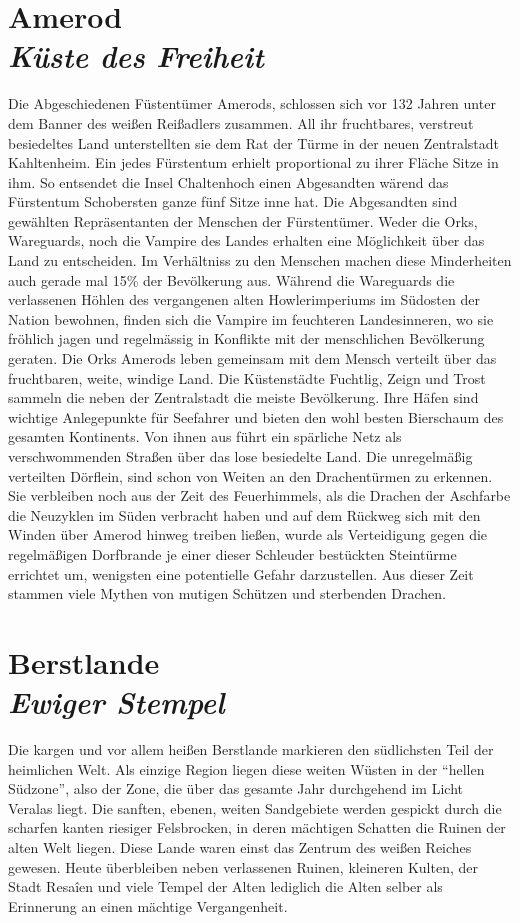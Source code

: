 \section*{Amerod \\ \textit{Küste des Freiheit}}
Die Abgeschiedenen Füstentümer Amerods, schlossen sich vor 132 Jahren unter dem Banner des weißen Reißadlers zusammen. All ihr fruchtbares, verstreut besiedeltes Land unterstellten sie dem Rat der Türme in der neuen Zentralstadt Kahltenheim. Ein jedes Fürstentum erhielt proportional zu ihrer Fläche Sitze in ihm. So entsendet die Insel Chaltenhoch einen Abgesandten wärend das Fürstentum Schobersten ganze fünf Sitze inne hat. Die Abgesandten sind gewählten Repräsentanten der Menschen der Fürstentümer. Weder die Orks, Wareguards, noch die Vampire des Landes erhalten eine Möglichkeit über das Land zu entscheiden. Im Verhältniss zu den Menschen machen diese Minderheiten auch gerade mal 15\% der Bevölkerung aus. Während die Wareguards die verlassenen Höhlen des vergangenen alten Howlerimperiums im Südosten der Nation bewohnen, finden sich die Vampire im feuchteren Landesinneren, wo sie fröhlich jagen und regelmässig in Konflikte mit der menschlichen Bevölkerung geraten. Die Orks Amerods leben gemeinsam mit dem Mensch verteilt über das fruchtbaren, weite, windige Land. Die Küstenstädte Fuchtlig, Zeign und Trost sammeln die neben der Zentralstadt die meiste Bevölkerung. Ihre Häfen sind wichtige Anlegepunkte für Seefahrer und bieten den wohl besten Bierschaum des gesamten Kontinents. Von ihnen aus führt ein spärliche Netz als verschwommenden Straßen über das lose besiedelte Land. Die unregelmäßig verteilten Dörflein, sind schon von Weiten an den Drachentürmen zu erkennen. Sie verbleiben noch aus der Zeit des Feuerhimmels, als die Drachen der Aschfarbe die Neuzyklen im Süden verbracht haben und auf dem Rückweg sich mit den Winden über Amerod hinweg treiben ließen, wurde als Verteidigung gegen die regelmäßigen Dorfbrande je einer dieser Schleuder bestückten Steintürme errichtet um, wenigsten eine potentielle Gefahr darzustellen. Aus dieser Zeit stammen viele Mythen von mutigen Schützen und sterbenden Drachen.

\section*{Berstlande \\ \textit{Ewiger Stempel}}
Die kargen und vor allem heißen Berstlande markieren den südlichsten Teil der heimlichen Welt. Als einzige Region liegen diese weiten Wüsten in der “hellen Südzone”, also der Zone, die über das gesamte Jahr durchgehend im Licht Veralas liegt. Die sanften, ebenen, weiten Sandgebiete werden gespickt durch die scharfen kanten riesiger Felsbrocken, in deren mächtigen Schatten die Ruinen der alten Welt liegen. Diese Lande waren einst das Zentrum des weißen Reiches gewesen. Heute überbleiben neben verlassenen Ruinen, kleineren Kulten, der Stadt Resaîen und viele Tempel der Alten lediglich die Alten selber als Erinnerung an einen mächtige Vergangenheit.

